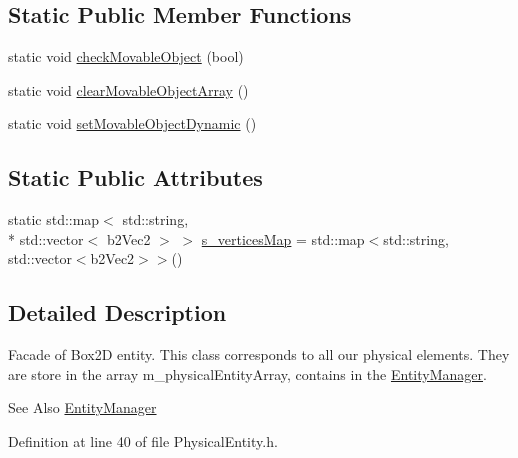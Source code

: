 \subsection*{Static Public Member Functions}
\begin{DoxyCompactItemize}
\item 
static void \hyperlink{class_symp_1_1_physical_entity_aa2d599780090c1c0880ea9d831ce7559}{check\-Movable\-Object} (bool)
\item 
static void \hyperlink{class_symp_1_1_physical_entity_ab286b5332b3efbc0a5539560e3b01a90}{clear\-Movable\-Object\-Array} ()
\item 
static void \hyperlink{class_symp_1_1_physical_entity_a2192174723e5bb3f78a8326c87c6d9a4}{set\-Movable\-Object\-Dynamic} ()
\end{DoxyCompactItemize}
\subsection*{Static Public Attributes}
\begin{DoxyCompactItemize}
\item 
static std\-::map$<$ std\-::string, \\*
std\-::vector$<$ b2\-Vec2 $>$ $>$ \hyperlink{class_symp_1_1_physical_entity_a91decceca101b25779e6839a0866b6b0}{s\-\_\-vertices\-Map} = std\-::map$<$std\-::string, std\-::vector$<$b2\-Vec2$>$$>$()
\end{DoxyCompactItemize}


\subsection{Detailed Description}
Facade of Box2\-D entity. This class corresponds to all our physical elements. They are store in the array m\-\_\-physical\-Entity\-Array, contains in the \hyperlink{class_symp_1_1_entity_manager}{Entity\-Manager}. \begin{DoxySeeAlso}{See Also}
\hyperlink{class_symp_1_1_entity_manager}{Entity\-Manager} 
\end{DoxySeeAlso}


Definition at line 40 of file Physical\-Entity.\-h.



